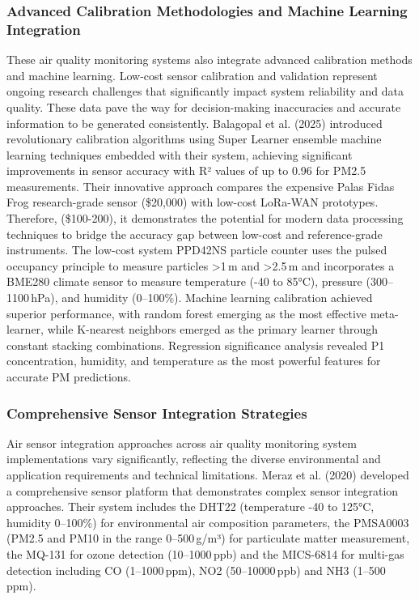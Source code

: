 \documentclass[conference]{IEEEtran}
\begin{document}
\subsubsection{Advanced Calibration Methodologies and Machine Learning Integration}
These air quality monitoring systems also integrate advanced calibration methods and machine learning.
Low-cost sensor calibration and validation represent ongoing research challenges that significantly impact system reliability and data quality. These data pave the way for decision-making inaccuracies and accurate information to be generated consistently. Balagopal et al. (2025) introduced revolutionary calibration algorithms using Super Learner ensemble machine learning techniques embedded with their system, achieving significant improvements in sensor accuracy with R² values of up to 0.96 for PM2.5 measurements. Their innovative approach compares the expensive Palas Fidas Frog research-grade sensor (\$20,000) with low-cost LoRa-WAN prototypes. Therefore, (\$100-200), it demonstrates the potential for modern data processing techniques to bridge the accuracy gap between low-cost and reference-grade instruments. The low-cost system PPD42NS particle counter uses the pulsed occupancy principle to measure particles >1\,\textmu m and >2.5\,\textmu m and incorporates a BME280 climate sensor to measure temperature (-40 to 85°C), pressure (300--1100\,hPa), and humidity (0--100\%). Machine learning calibration achieved superior performance, with random forest emerging as the most effective meta-learner, while K-nearest neighbors emerged as the primary learner through constant stacking combinations. Regression significance analysis revealed P1 concentration, humidity, and temperature as the most powerful features for accurate PM predictions.~\cite{balagopal2025}

\subsubsection{Comprehensive Sensor Integration Strategies}
Air sensor integration approaches across air quality monitoring system implementations vary significantly, reflecting the diverse environmental and application requirements and technical limitations. Meraz et al. (2020) developed a comprehensive sensor platform that demonstrates complex sensor integration approaches. Their system includes the DHT22 (temperature -40 to 125°C, humidity 0--100\%) for environmental air composition parameters, the PMSA0003 (PM2.5 and PM10 in the range 0--500\,\textmu g/m³) for particulate matter measurement, the MQ-131 for ozone detection (10--1000\,ppb) and the MICS-6814 for multi-gas detection including CO (1--1000\,ppm), NO2 (50--10000\,ppb) and NH3 (1--500\,ppm).
\end{document}
